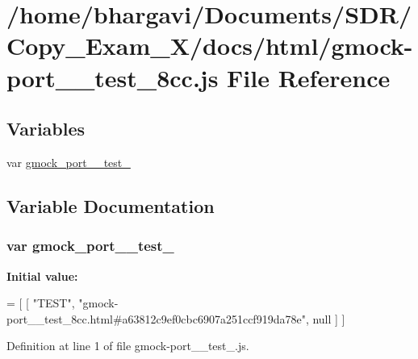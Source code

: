 \hypertarget{gmock-port____test__8cc_8js}{}\section{/home/bhargavi/\+Documents/\+S\+D\+R/\+Copy\+\_\+\+Exam\+\_\+X/docs/html/gmock-\/port\+\_\+\+\_\+test\+\_\+8cc.js File Reference}
\label{gmock-port____test__8cc_8js}
\subsection*{Variables}
\begin{DoxyCompactItemize}
\item 
var \hyperlink{gmock-port____test__8cc_8js_a0c54aee49cfe9e344a2d56d0ece9135e}{gmock\+\_\+port\+\_\+\+\_\+test\+\_}
\end{DoxyCompactItemize}


\subsection{Variable Documentation}
\subsubsection[{\texorpdfstring{gmock\+\_\+port\+\_\+\+\_\+test\+\_\+8cc}{gmock_port__test_8cc}}]{\setlength{\rightskip}{0pt plus 5cm}var gmock\+\_\+port\+\_\+\+\_\+test\+\_}\hypertarget{gmock-port____test__8cc_8js_a0c54aee49cfe9e344a2d56d0ece9135e}{}\label{gmock-port____test__8cc_8js_a0c54aee49cfe9e344a2d56d0ece9135e}
{\bfseries Initial value\+:}
\begin{DoxyCode}
=
[
    [ \textcolor{stringliteral}{"TEST"}, \textcolor{stringliteral}{"gmock-port\_\_test\_8cc.html#a63812c9ef0cbc6907a251ccf919da78e"}, null ]
]
\end{DoxyCode}


Definition at line 1 of file gmock-\/port\+\_\+\+\_\+test\+\_.\+js.

